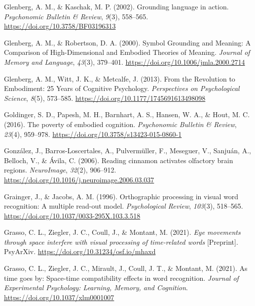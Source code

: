 \documentclass[
  a4paper,12pt,twoside,onecolumn,openright,final,oldfontcommands]{memoir}
\newlength{\cslhangindent}
\newlength{\cslentryspacingunit} %
\newenvironment{CSLReferences}[2] %
 {%
  \setlength{\parindent}{0pt}
  \ifodd #1
  \let\oldpar\par
  \def\par{\hangindent=\cslhangindent\oldpar}
  \fi
  \setlength{\parskip}{#2\cslentryspacingunit}
 }%
 {}
\begin{document}
\begin{CSLReferences}{1}{0}
\leavevmode{}%
Glenberg, A. M., \& Kaschak, M. P. (2002). Grounding language in action. \emph{Psychonomic Bulletin \& Review}, \emph{9}(3), 558--565. \url{https://doi.org/10.3758/BF03196313}

\leavevmode{}%
Glenberg, A. M., \& Robertson, D. A. (2000). Symbol {Grounding} and {Meaning}: {A} {Comparison} of {High}-{Dimensional} and {Embodied} {Theories} of {Meaning}. \emph{Journal of Memory and Language}, \emph{43}(3), 379--401. \url{https://doi.org/10.1006/jmla.2000.2714}

\leavevmode{}%
Glenberg, A. M., Witt, J. K., \& Metcalfe, J. (2013). From the {Revolution} to {Embodiment}: 25 {Years} of {Cognitive} {Psychology}. \emph{Perspectives on Psychological Science}, \emph{8}(5), 573--585. \url{https://doi.org/10.1177/1745691613498098}

\leavevmode{}%
Goldinger, S. D., Papesh, M. H., Barnhart, A. S., Hansen, W. A., \& Hout, M. C. (2016). The poverty of embodied cognition. \emph{Psychonomic Bulletin \& Review}, \emph{23}(4), 959--978. \url{https://doi.org/10.3758/s13423-015-0860-1}

\leavevmode{}%
González, J., Barros-Loscertales, A., Pulvermüller, F., Meseguer, V., Sanjuán, A., Belloch, V., \& Ávila, C. (2006). Reading cinnamon activates olfactory brain regions. \emph{NeuroImage}, \emph{32}(2), 906--912. \url{https://doi.org/10.1016/j.neuroimage.2006.03.037}

\leavevmode{}%
Grainger, J., \& Jacobs, A. M. (1996). Orthographic processing in visual word recognition: {A} multiple read-out model. \emph{Psychological Review}, \emph{103}(3), 518--565. \url{https://doi.org/10.1037/0033-295X.103.3.518}

\leavevmode{}%
Grasso, C. L., Ziegler, J. C., Coull, J., \& Montant, M. (2021). \emph{Eye movements through space interfere with visual processing of time-related words} {[}Preprint{]}. PsyArXiv. \url{https://doi.org/10.31234/osf.io/mhaxd}

\leavevmode{}%
Grasso, C. L., Ziegler, J. C., Mirault, J., Coull, J. T., \& Montant, M. (2021). As time goes by: {Space}-time compatibility effects in word recognition. \emph{Journal of Experimental Psychology: Learning, Memory, and Cognition}. \url{https://doi.org/10.1037/xlm0001007}


\end{CSLReferences}
\end{document}
